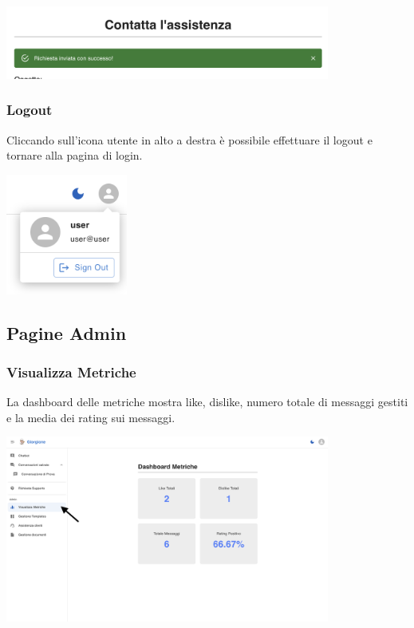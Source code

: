 \begin{center}
    \includegraphics[width=0.8\textwidth]{./img/RichiestaAssistenza2.png}
    \label{fig:InvioRiuscito}
\end{center}

\subsubsection{Logout}
Cliccando sull’icona utente in alto a destra è possibile effettuare il logout e tornare alla pagina di login.
\begin{center}
    \includegraphics[width=0.3\textwidth]{./img/logout.png}
\end{center}

\newpage
\subsection{Pagine Admin}

\subsubsection{Visualizza Metriche}
La dashboard delle metriche mostra like, dislike, numero totale di messaggi gestiti e la media dei rating sui messaggi.
\begin{center}
    \includegraphics[width=0.8\textwidth]{./img/visualizzaMetriche.png}
    \label{fig:Metriche}
\end{center}

